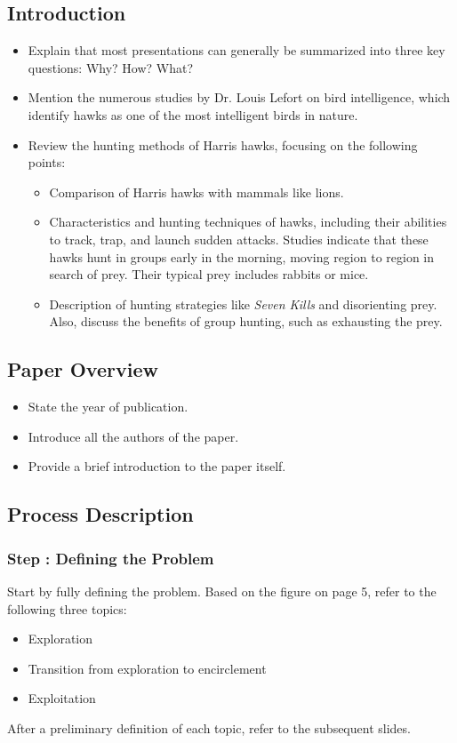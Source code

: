 \documentclass[12pt]{article}
\begin{document}
\subsection*{Introduction}
\begin{itemize}
    \item Explain that most presentations can generally be summarized into three key questions: 
     Why?  
     How?  
     What?  
    
    \item Mention the numerous studies by Dr. Louis Lefort on bird intelligence, which identify hawks as one of the most intelligent birds in nature.
    
    \item Review the hunting methods of Harris hawks, focusing on the following points:
    \begin{itemize}
        \item Comparison of Harris hawks with mammals like lions.
        \item Characteristics and hunting techniques of hawks, including their abilities to track, trap, and launch sudden attacks. Studies indicate that these hawks hunt in groups early in the morning, moving region to region in search of prey. Their typical prey includes rabbits or mice.
        \item Description of hunting strategies like \textit{Seven Kills} and disorienting prey. Also, discuss the benefits of group hunting, such as exhausting the prey.
    \end{itemize}
\end{itemize}

\subsection*{Paper Overview}
\begin{itemize}
    \item State the year of publication.
    \item Introduce all the authors of the paper.
    \item Provide a brief introduction to the paper itself.
\end{itemize}

\subsection*{Process Description}
\subsubsection*{Step : Defining the Problem}
Start by fully defining the problem.  
Based on the figure on page 5, refer to the following three topics:
\begin{itemize}
    \item Exploration
    \item Transition from exploration to encirclement
    \item Exploitation
\end{itemize}
After a preliminary definition of each topic, refer to the subsequent slides.
\end{document}
